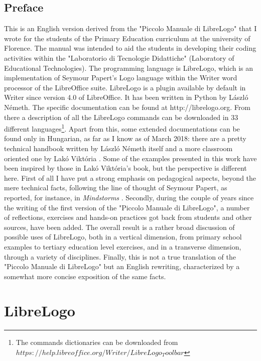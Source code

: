 \section{Preface}
This is an English version derived from the "Piccolo Manuale di LibreLogo" that I wrote for the students of the Primary Education curriculum at the university of Florence. The manual was intended to aid the students in developing their coding activities within the "Laboratorio di Tecnologie Didattiche" (Laboratory of Educational Technologies). The programming language is LibreLogo, which is an implementation of Seymour Papert's Logo language within the Writer word processor of the LibreOffice  suite. LibreLogo is a plugin available by default in Writer since version 4.0 of LibreOffice. It has been written in Python by László Németh. The specific documentation can be found at http://librelogo.org. From there a description of all the LibreLogo commands can be downloaded in 33 different languages\footnote{The commands dictionaries can be downloaded from $https://help.libreoffice.org/Writer/LibreLogo_Toolbar$}. Apart from this, some extended documentations can be found only in Hungarian, as far as I know as of March 2018: there are a pretty technical handbook written by László Németh itself \cite{LibreLogo2} and a more classroom oriented one by Lakó Viktória \cite{LibreLogo3}. Some of the examples presented in this work have been inspired by those in  Lakó Viktória's book,  but the perspective is different here. First of all I have put  a strong emphasis on pedagogical aspects, beyond the mere technical facts, following the line of thought of Seymour Papert, as reported, for instance, in \textit{Mindstorms} \cite{Papert}. Secondly, during the couple of years since the writing of the first version of the "Piccolo Manuale di LibreLogo",  a number of reflections, exercises and hands-on practices got back from students and other sources, have been added. The overall result is a rather broad discussion of possible uses of LibreLogo, both in a vertical dimension, from primary school examples to tertiary education level exercises, and in a transverse dimension, through a variety of disciplines. Finally, this is not a true translation of the "Piccolo Manuale di LibreLogo" but an English rewriting, characterized by a somewhat more concise exposition of the same facts.

\chapter{LibreLogo} \label{cap:librelogo}

